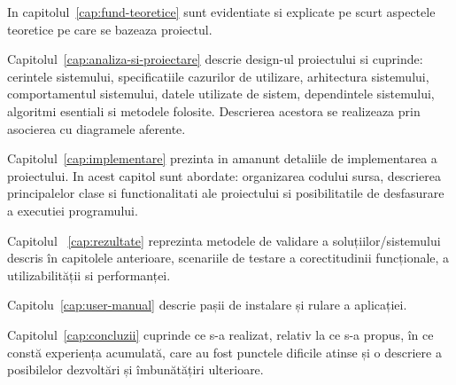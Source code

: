 In capitolul~\ref{cap:fund-teoretice} sunt evidentiate si explicate pe scurt aspectele teoretice pe care se bazeaza proiectul.

Capitolul~\ref{cap:analiza-si-proiectare} descrie design-ul proiectului si cuprinde: cerintele sistemului, specificatiile cazurilor de utilizare, arhitectura sistemului, comportamentul sistemului, datele utilizate de sistem, dependintele sistemului, algoritmi esentiali si metodele folosite. Descrierea acestora se realizeaza prin asocierea cu diagramele aferente.


Capitolul~\ref{cap:implementare} prezinta in amanunt detaliile de implementarea a proiectului. In acest capitol sunt abordate: organizarea codului sursa, descrierea principalelor clase si functionalitati ale proiectului si posibilitatile de desfasurare a executiei programului.

Capitolul ~\ref{cap:rezultate} reprezinta metodele de validare a soluțiilor/sistemului descris în capitolele anterioare, scenariile de testare a corectitudinii funcționale, a utilizabilității si performanței.

Capitolu~\ref{cap:user-manual} descrie pașii de instalare și rulare a aplicației.

Capitolul~\ref{cap:concluzii} cuprinde ce s-a realizat, relativ la ce s-a propus, în ce constă experiența acumulată, care au fost punctele dificile atinse și o descriere a posibilelor dezvoltări și îmbunătățiri ulterioare.